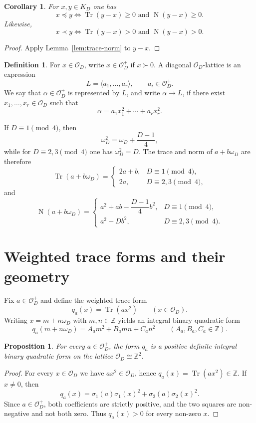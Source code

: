 \documentclass[manuscript]{acmart}
\theoremstyle{plain}
\newtheorem{proposition}[theorem]{Proposition}
\newtheorem{corollary}[theorem]{Corollary}
\theoremstyle{definition}
\newtheorem{definition}[theorem]{Definition}
\theoremstyle{nonitalicremark}
\newcommand{\Z}{\mathbb{Z}}
\newcommand{\OO}{\mathcal{O}}
\newcommand{\OD}{\OO_D}
\newcommand{\Tr}{\operatorname{Tr}}
\newcommand{\N}{\operatorname{N}}
\begin{document}
\begin{corollary}\label{cor:comparison}
For $x,y\in K_D$ one has
\[
x\preccurlyeq y
\iff
\Tr(y-x)\ge 0\text{ and }\N(y-x)\ge 0.
\]
Likewise,
\[
x\prec y
\iff
\Tr(y-x)>0\text{ and }\N(y-x)>0.
\]
\end{corollary}

\begin{proof}
Apply Lemma~\ref{lem:trace-norm} to $y-x$.
\end{proof}

\begin{definition}
For $x\in\OD$, write $x\in\OD^+$ if $x\succ 0$. A diagonal $\OD$-lattice is an expression
\[
L=\langle a_1,\dots,a_r\rangle,
\qquad a_i\in\OD^+.
\]
We say that $\alpha\in\OD^+$ is represented by $L$, and write $\alpha\to L$, if there exist
$x_1,\dots,x_r\in\OD$ such that
\[
\alpha=a_1x_1^2+\cdots+a_rx_r^2.
\]
\end{definition}

If $D\equiv 1\pmod 4$, then
\[
\omega_D^2=\omega_D+\frac{D-1}{4},
\]
while for $D\equiv 2,3\pmod 4$ one has $\omega_D^2=D$. The trace and norm of $a+b\omega_D$ are therefore
\[
\Tr(a+b\omega_D)=
\begin{cases}
2a+b, & D\equiv 1\pmod 4,\\
2a, & D\equiv 2,3\pmod 4,
\end{cases}
\]
and
\[
\N(a+b\omega_D)=
\begin{cases}
a^2+ab-\dfrac{D-1}{4}b^2, & D\equiv 1\pmod 4,\\
a^2-Db^2, & D\equiv 2,3\pmod 4.
\end{cases}
\]

\section{Weighted trace forms and their geometry}\label{sec:weighted}

Fix $a\in\OD^+$ and define the weighted trace form
\[
q_a(x)=\Tr(a x^2)
\qquad (x\in\OD).
\]
Writing $x=m+n\omega_D$ with $m,n\in\Z$ yields an integral binary quadratic form
\[
q_a(m+n\omega_D)=A_am^2+B_amn+C_an^2
\qquad (A_a,B_a,C_a\in\Z).
\]

\begin{proposition}\label{prop:positive-definite}
For every $a\in\OD^+$, the form $q_a$ is a positive definite integral binary quadratic form on the
lattice $\OD\cong\Z^2$.
\end{proposition}

\begin{proof}
For every $x\in\OD$ we have $a x^2\in\OD$, hence $q_a(x)=\Tr(a x^2)\in\Z$. If $x\ne 0$, then
\[
q_a(x)=\sigma_1(a)\sigma_1(x)^2+\sigma_2(a)\sigma_2(x)^2.
\]
Since $a\in\OD^+$, both coefficients are strictly positive, and the two squares are non-negative and
not both zero. Thus $q_a(x)>0$ for every non-zero $x$.
\end{proof}
\end{document}
